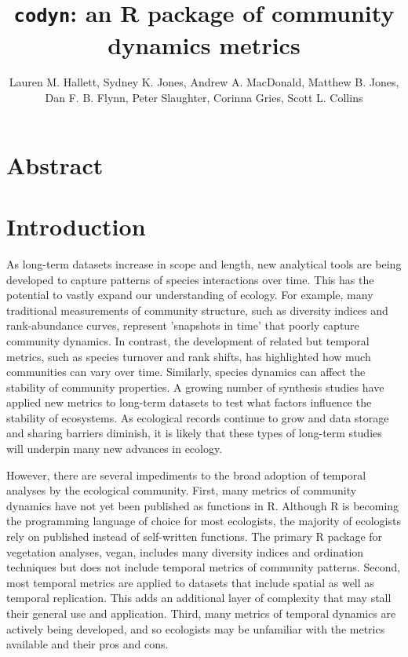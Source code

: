\documentclass[11pt]{article}
\title{\texttt{codyn}: an R package of community dynamics metrics}
\author{Lauren M. Hallett, Sydney K. Jones,  Andrew A. MacDonald,  Matthew B. Jones, Dan F. B. Flynn, Peter Slaughter, Corinna Gries, Scott L. Collins}
\date{}
\begin{document}
\maketitle

\section{Abstract}

\section{Introduction}
As long-term datasets increase in scope and length, new analytical tools are being developed to capture patterns of species interactions over time. This has the potential to vastly expand our understanding of ecology. For example, many traditional measurements of community structure, such as diversity indices and rank-abundance curves, represent 'snapshots in time' that poorly capture community dynamics. In contrast, the development of related but temporal metrics, such as species turnover and rank shifts, has highlighted how much communities can vary over time. Similarly, species dynamics can affect the stability of community properties. A growing number of synthesis studies have applied new metrics to long-term datasets to test what factors influence the stability of ecosystems. As ecological records continue to grow and data storage and sharing barriers diminish, it is likely that these types of long-term studies will underpin many new advances in ecology.

However, there are several impediments to the broad adoption of temporal analyses by the ecological community. First, many metrics of community dynamics have not yet been published as functions in R. Although R is becoming the programming language of choice for most ecologists, the majority of ecologists rely on published instead of self-written functions. The primary R package for vegetation analyses, vegan, includes many diversity indices and ordination techniques but does not include temporal metrics of community patterns. Second, most temporal metrics are applied to datasets that include spatial as well as temporal replication. This adds an additional layer of complexity that may stall their general use and application. Third, many metrics of temporal dynamics are actively being developed, and so ecologists may be unfamiliar with the metrics available and their pros and cons.
\end{document}
